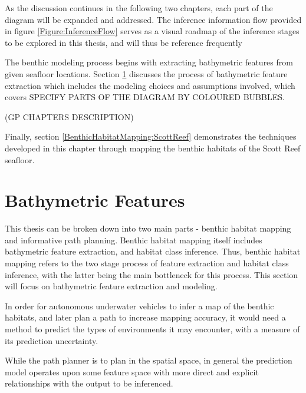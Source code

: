 		As the discussion continues in the following two chapters, each part of the diagram will be expanded and addressed. The inference information flow provided in figure \ref{Figure:InferenceFlow} serves as a visual roadmap of the inference stages to be explored in this thesis, and will thus be reference frequently
		
	 The benthic modeling process begins with extracting bathymetric features from given seafloor locations. Section \ref{BenthicHabitatMapping:BathymetricFeatures} discusses the process of bathymetric feature extraction which includes the modeling choices and assumptions involved, which covers {\color{BurntOrange} SPECIFY PARTS OF THE DIAGRAM BY COLOURED BUBBLES}. 
	 
	 (GP CHAPTERS DESCRIPTION)
	 
	 Finally, section \ref{BenthicHabitatMapping:ScottReef} demonstrates the techniques developed in this chapter through mapping the benthic habitats of the Scott Reef seafloor. 
		
	\section{Bathymetric Features}
	\label{BenthicHabitatMapping:BathymetricFeatures}
	
		This thesis can be broken down into two main parts - benthic habitat mapping and informative path planning. Benthic habitat mapping itself includes bathymetric feature extraction, and habitat class inference. Thus, benthic habitat mapping refers to the two stage process of feature extraction and habitat class inference, with the latter being the main bottleneck for this process. This section will focus on bathymetric feature extraction and modeling.
			
		In order for autonomous underwater vehicles to infer a map of the benthic habitats, and later plan a path to increase mapping accuracy, it would need a method to predict the types of environments it may encounter, with a measure of its prediction uncertainty.
		
		While the path planner is to plan in the spatial space, in general the prediction model operates upon some feature space with more direct and explicit relationships with the output to be inferenced.
		
